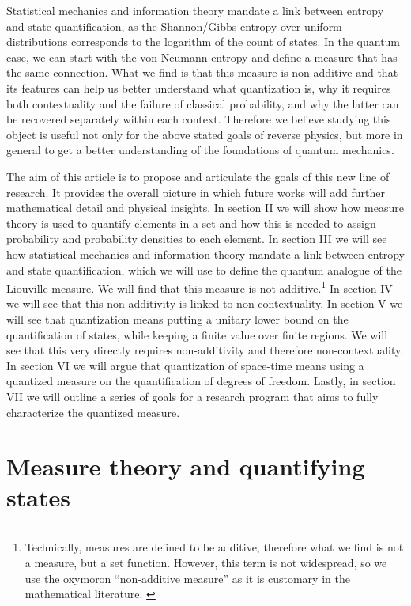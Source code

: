 \documentclass[entropy,article,submit,pdftex,moreauthors]{Definitions/mdpi}
\begin{document}
Statistical mechanics and information theory mandate a link between entropy and state quantification, as the Shannon/Gibbs entropy over uniform distributions corresponds to the logarithm of the count of states. In the quantum case, we can start with the von Neumann entropy and define a measure that has the same connection. What we find is that this measure is non-additive and that its features can help us better understand what quantization is, why it requires both contextuality and the failure of classical probability, and why the latter can be recovered separately within each context. Therefore we believe studying this object is useful not only for the above stated goals of reverse physics, but more in general to get a better understanding of the foundations of quantum mechanics.

The aim of this article is to propose and articulate the goals of this new line of research. It provides the overall picture in which future works will add further mathematical detail and physical insights. In section II we will show how measure theory is used to quantify elements in a set and how this is needed to assign probability and probability densities to each element. In section III we will see how statistical mechanics and information theory mandate a link between entropy and state quantification, which we will use to define the quantum analogue of the Liouville measure. We will find that this measure is not additive.\footnote{Technically, measures are defined to be additive, therefore what we find is not a measure, but a set function. However, this term is not widespread, so we use the oxymoron ``non-additive measure'' as it is customary in the mathematical literature. \cite{denneberg1994non,nonadditive2014}} In section IV we will see that this non-additivity is linked to non-contextuality. In section V we will see that quantization means putting a unitary lower bound on the quantification of states, while keeping a finite value over finite regions. We will see that this very directly requires non-additivity and therefore non-contextuality. In section VI we will argue that quantization of space-time means using a quantized measure on the quantification of degrees of freedom. Lastly, in section VII we will outline a series of goals for a research program that aims to fully characterize the quantized measure.

\section{Measure theory and quantifying states}
\end{document}
